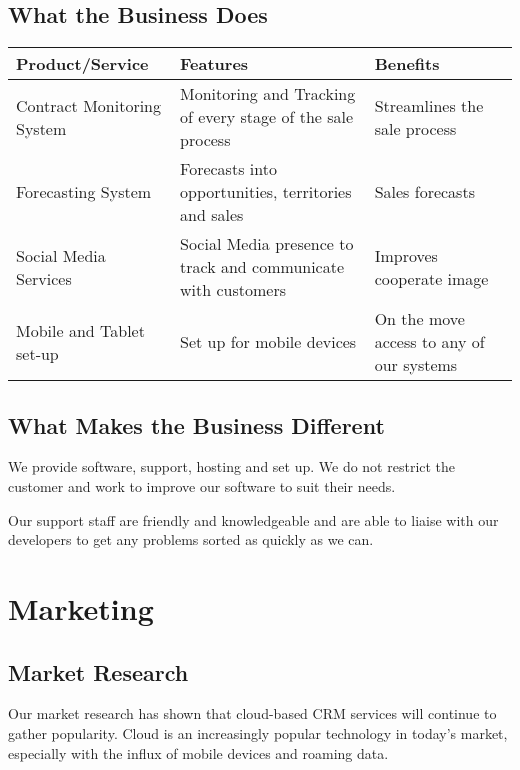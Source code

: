 \documentclass[DIV=calc, paper=a4, fontsize=11pt]{scrartcl}	 %
\begin{document}
\subsection{What the Business Does}
\begin{tabular}{|l|p{}|p{}|}\hline
Product/Service & Features & Benefits \\ \hline
Contract Monitoring System & Monitoring and Tracking of every stage of the sale process & Streamlines the sale process \\ \hline
Forecasting System & Forecasts into opportunities, territories and sales & Sales forecasts \\ \hline
Social Media Services & Social Media presence to track and communicate with customers & Improves cooperate image \\ \hline
Mobile and Tablet set-up & Set up for mobile devices & On the move access to any of our systems \\ \hline
\end{tabular}


\subsection{What Makes the Business Different}
We provide software, support, hosting and set up. We do not restrict the customer and work to 
improve our software to suit their needs.

Our support staff are friendly and knowledgeable and are able to liaise with our developers to get
any problems sorted as quickly as we can.






\section{Marketing}

\subsection{Market Research}
Our market research has shown that cloud-based CRM services will continue to gather popularity.
Cloud is an increasingly popular technology in today's market, especially with the influx of
mobile devices and roaming data.
\end{document}
